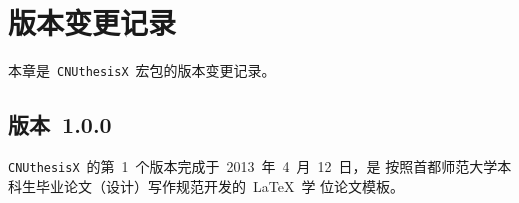﻿
\chapter{版本变更记录}

本章是~\texttt{CNUthesisX}~宏包的版本变更记录。

\section{版本~1.0.0}

\texttt{CNUthesisX}~的第~1~个版本完成于~2013~年~4~月~12~日，是
按照首都师范大学本科生毕业论文（设计）写作规范开发的~\LaTeX~学
位论文模板。